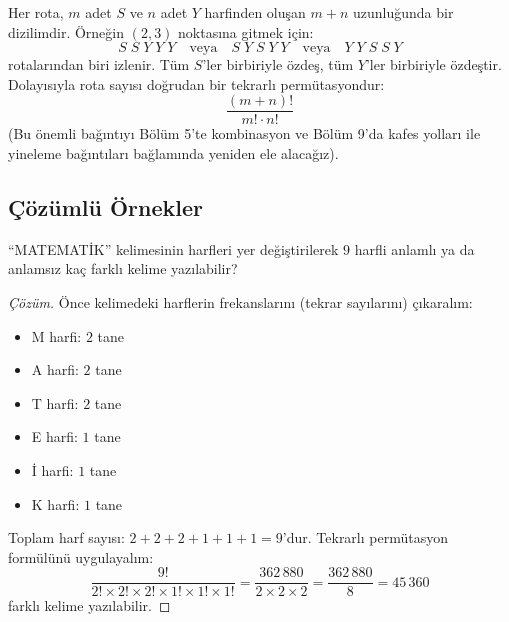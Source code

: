 Her rota, $m$ adet $S$ ve $n$ adet $Y$ harfinden oluşan $m+n$ uzunluğunda bir dizilimdir. Örneğin $(2, 3)$ noktasına gitmek için:
\[ S \; S \; Y \; Y \; Y \quad \text{veya} \quad S \; Y \; S \; Y \; Y \quad \text{veya} \quad Y \; Y \; S \; S \; Y \]
rotalarından biri izlenir. Tüm $S$'ler birbiriyle özdeş, tüm $Y$'ler birbiriyle özdeştir. Dolayısıyla rota sayısı doğrudan bir tekrarlı permütasyondur:
\[ \frac{(m+n)!}{m! \cdot n!} \]
(Bu önemli bağıntıyı Bölüm 5'te kombinasyon ve Bölüm 9'da kafes yolları ile yineleme bağıntıları bağlamında yeniden ele alacağız).

\subsection{Çözümlü Örnekler}

\begin{example}
``MATEMATİK'' kelimesinin harfleri yer değiştirilerek $9$ harfli anlamlı ya da anlamsız kaç farklı kelime yazılabilir?
\end{example}
\begin{proof}[Çözüm]
Önce kelimedeki harflerin frekanslarını (tekrar sayılarını) çıkaralım:
\begin{itemize}
  \item M harfi: $2$ tane
  \item A harfi: $2$ tane
  \item T harfi: $2$ tane
  \item E harfi: $1$ tane
  \item İ harfi: $1$ tane
  \item K harfi: $1$ tane
\end{itemize}
Toplam harf sayısı: $2 + 2 + 2 + 1 + 1 + 1 = 9$'dur.
Tekrarlı permütasyon formülünü uygulayalım:
\[ \frac{9!}{2! \times 2! \times 2! \times 1! \times 1! \times 1!} = \frac{362\,880}{2 \times 2 \times 2} = \frac{362\,880}{8} = 45\,360 \]
farklı kelime yazılabilir.
\end{proof}

